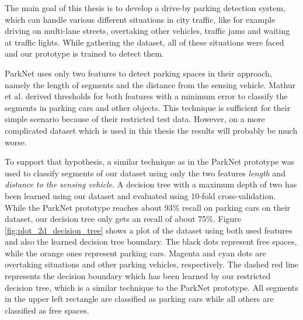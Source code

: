 The main goal of this thesis is to develop a drive-by parking detection system, which can handle various different situations in city traffic, like for example driving on multi-lane streets, overtaking other vehicles, traffic jams and waiting at traffic lights. While gathering the dataset, all of these situations were faced and our prototype is trained to detect them.

ParkNet uses only two features to detect parking spaces in their approach, namely the length of segments and the distance from the sensing vehicle. Mathur et al. derived thresholds for both features with a minimum error to classify the segments in parking cars and other objects. This technique is sufficient for their simple scenario because of their restricted test data. However, on a more complicated dataset which is used in this thesis the results will probably be much worse.

To support that hypothesis, a similar technique as in the ParkNet prototype was used to classify segments of our dataset using only the two features \emph{length} and \emph{distance to the sensing vehicle}. A decision tree with a maximum depth of two has been learned using our dataset and evaluated using 10-fold cross-validation. While the ParkNet prototype reaches about 93\% recall on parking cars on their dataset, our decision tree only gets an recall of about 75\%. Figure \ref{fig:plot_2d_decision_tree} shows a plot of the dataset using both used features and also the learned decision tree boundary. The black dots represent free spaces, while the orange ones represent parking cars. Magenta and cyan dots are overtaking situations and other parking vehicles, respectively. The dashed red line represents the decision boundary which has been learned by our restricted decision tree, which is a similar technique to the ParkNet prototype. All segments in the upper left rectangle are classified as parking cars while all others are classified as free spaces.

